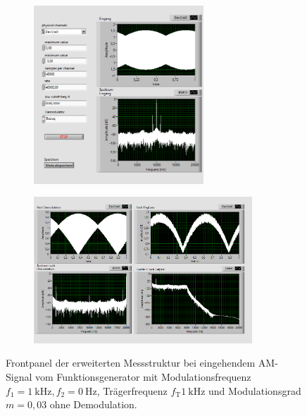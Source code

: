 		\begin{figure}[H]
			\centering
			\begin{subfigure}[c]{\textwidth}
				\centering
				\includegraphics[width=0.7\textwidth]{pic/dam_betrag1.png}
			\end{subfigure}
			\begin{subfigure}[c]{\textwidth}
				\centering
				\includegraphics[width=0.9\textwidth]{pic/dam_betrag2.png}
			\end{subfigure}	
			\caption{Frontpanel der erweiterten Messstruktur bei eingehendem AM-Signal vom Funktionsgenerator mit Modulationsfrequenz $f_1= \SI{1}{\kilo\hertz}, f_2 = \SI{0}{\hertz}$, Trägerfrequenz $f_\text{T}\SI{1}{\kilo\hertz}$ und Modulationsgrad $m = 0,03$ ohne Demodulation.}
			\label{fig:dam_betrag}	
		\end{figure} 